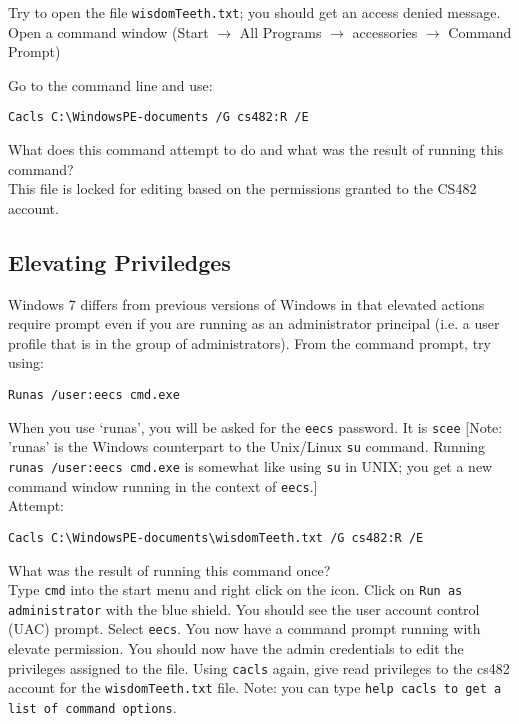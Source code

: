 \documentclass{article}
\begin{document}
\indent Try to open the file {\tt wisdomTeeth.txt}; you should get an access denied message. Open a command window (Start $\rightarrow$ All Programs { $\rightarrow$ }accessories  $\rightarrow$  Command Prompt) 

Go to the command line and use: 
\begin{verbatim}
Cacls C:\WindowsPE-documents /G cs482:R /E 
\end{verbatim}

\question What does this command attempt to do and what was the result of running this command? \\



This file is locked for editing based on the permissions granted to the CS482 account. 
\subsection{Elevating Priviledges}
Windows 7 differs from previous versions of Windows in that elevated actions require prompt even if you are running as an administrator principal (i.e. a user profile that is in the group of administrators). From the command prompt, try using:
\begin{verbatim}
Runas /user:eecs cmd.exe
\end{verbatim}
When you use `runas', you will be asked for the {\tt eecs} password. It is {\tt scee}
[Note: 'runas' is the Windows counterpart to the Unix/Linux {\tt su} command. Running {\tt runas /user:eecs cmd.exe} is somewhat like using {\tt su} in UNIX; you get a new command window running in the context of {\tt eecs}.]  \\
Attempt:
\begin{verbatim}
Cacls C:\WindowsPE-documents\wisdomTeeth.txt /G cs482:R /E
\end{verbatim}
\question What was the result of running this command once? \\

Type {\tt cmd} into the start menu and right click on the icon.  Click on {\tt Run as administrator} with the blue shield.  You should see the user account control (UAC) prompt.  Select {\tt eecs}.  You now have a command prompt running with elevate permission.  You should now have the admin credentials to edit the privileges assigned to the file. Using {\tt cacls} again, give read privileges to the cs482 account for the {\tt wisdomTeeth.txt} file. Note: you can type {\tt help cacls to get a list of command options}.\\
\end{document}
